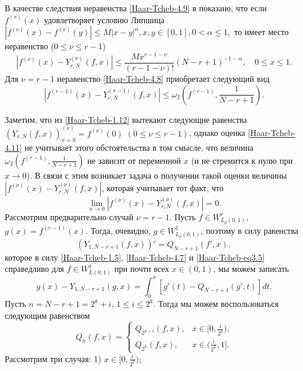 В качестве следствия неравенства \eqref{Haar-Tcheb-4.9} в \cite{Haar-Tcheb-Shar19} показано, что если $f^{(r)}(x)$ удовлетворяет условию Липшица
$
|f^{(r)}(x)-f^{(r)}(y)|\le M|x-y|^\alpha, x,y\in[0,1], 0< \alpha\le1,
$
то имеет место неравенство ($0\le\nu\le r-1$)
\begin{equation}\label{Haar-Tcheb-4.10}
 |f^{(\nu)}(x)-Y_{r,N}^{(\nu)}(f,x)|\le \frac{Mx^{r-1-\nu}}{(r-1-\nu)!}(N-r+1)^{-1-\alpha}, \quad 0\le x\le1. \end{equation}
Для $\nu=r-1$ неравенство \eqref{Haar-Tcheb-4.8}  приобретает следующий вид
\begin{equation}\label{Haar-Tcheb-4.11}
 |f^{(r-1)}(x)-Y_{r,N}^{(r-1)}(f,x)|\le \omega_2(f^{(r-1)},\frac{1}{N-r+1}).
 \end{equation}

Заметим, что из \eqref{Haar-Tcheb-1.12} вытекают следующие равенства
$(Y_{r,N}(f,x))^{(\nu)}_{x=0}=f^{(\nu)}(0)$ $ (0\le\nu\le r-1)$, однако оценка \eqref{Haar-Tcheb-4.11} не учитывает этого обстоятельства в том смысле, что величина $\omega_2(f^{(r-1)},\frac{1}{N-r+1})$ не зависит от переменной $x$ (и не стремится к нулю при $x\to0$). В связи с этим возникает задача о получении такой оценки величины $|f^{(\nu)}(x)-Y_{r,N}^{(\nu)}(f,x)|$, которая учитывает тот факт, что $$\lim_{x\to0}|f^{(\nu)}(x)-Y_{r,N}^{(\nu)}(f,x)|=0.$$
Рассмотрим предварительно случай $\nu=r-1$.
Пусть $f\in W^r_{L_\rho(0,1)}$, $g(x)=f^{(r-1)}(x)$. Тогда, очевидно, $g\in W^1_{L_\rho(0,1)}$, поэтому в силу равенства
 \begin{equation}\label{Haar-Tcheb-4.12}
 (Y_{1,N-r+1}(f,x))'=Q_{N-r+1}(f',x),
 \end{equation}
которое в силу \eqref{Haar-Tcheb-1.5}, \eqref{Haar-Tcheb-4.7} и \eqref{Haar-Tcheb-eq3.5} справедливо для $f\in W^1_{L(0,1)}$  при почти всех $x\in (0,1)$,    мы можем записать
\begin{equation}\label{Haar-Tcheb-eq4.13}
g(x)-Y_{1,N-r+1}(g,x)=\int_0^x [g'(t)- Q_{N-r+1}(g',t)]dt.
\end{equation}
Пусть $n=N-r+1=2^k+i$, $1\le i\le 2^k$. Тогда мы можем воспользоваться следующим равенством \cite{Haar-Tcheb-KashSaak}
\begin{equation}\label{Haar-Tcheb-eq4.14}
Q_n(f,x)=\begin{cases} Q_{2^{k+1}}(f,x), &\text{$x\in[0,\frac{i}{2^k})$,}\\
 Q_{2^{k}}(f,x), &\text{$x\in(\frac{i}{2^k},1]$.}
\end{cases}
\end{equation}
Рассмотрим три случая: 1) $x\in[0,\frac{i}{2^k})$;
